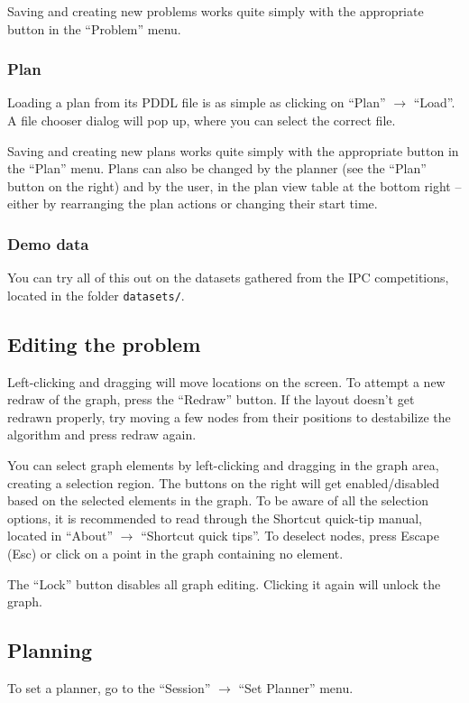 Saving and creating new problems works quite simply with the appropriate button in the ``Problem'' menu.

\subsubsection*{Plan}
Loading a plan from its PDDL file is as simple as clicking on ``Plan'' $\to$ ``Load''.
A file chooser dialog will pop up, where you can select the correct file.

Saving and creating new plans works quite simply with the appropriate button in the ``Plan'' menu.
Plans can also be changed by the planner (see the ``Plan'' button on the right) and by the user, in the plan view
table at the bottom right -- either by rearranging the plan actions or changing their start time.

\subsubsection*{Demo data}
You can try all of this out on the datasets gathered from the IPC competitions, located in the folder \texttt{datasets/}.

\subsection*{Editing the problem}
Left-clicking and dragging will move locations on the screen. To attempt a new redraw of the graph,
press the ``Redraw'' button. If the layout doesn't get redrawn properly, try moving a few nodes from their
positions to destabilize the algorithm and press redraw again.

You can select graph elements by left-clicking and dragging in the graph area, creating a selection region.
The buttons on the right will get enabled/disabled based on the selected elements in the graph.
To be aware of all the selection options, it is recommended to read through the
Shortcut quick-tip manual, located in ``About'' $\to$ ``Shortcut quick tips''. To deselect nodes,
press Escape (Esc) or click on a point in the graph containing no element.

The ``Lock'' button disables all graph editing. Clicking it again will unlock the graph.

\subsection*{Planning}
To set a planner, go to the ``Session'' $\to$ ``Set Planner'' menu.

